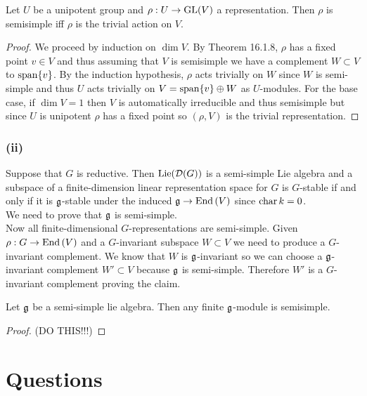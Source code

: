 \documentclass[12pt]{article}
\begin{document}
\begin{lemma}
Let $U$ be a unipotent group and $\rho : U \to \mathrm{GL}{(V)}$ a representation. Then $\rho$ is semisimple iff $\rho$ is the trivial action on $V$.
\end{lemma}

\begin{proof}
We proceed by induction on $\dim{V}$. By Theorem 16.1.8, $\rho$ has a fixed point $v \in V$ and thus assuming that $V$ is semisimple we have a complement $W \subset V$ to $\mathrm{span}\! \left\{v \right\}$. By the induction hypothesis, $\rho$ acts trivially on $W$ since $W$ is semi-simple and thus $U$ acts trivially on $V = \mathrm{span}\! \left\{v \right\} \oplus W$ as $U$-modules. For the base case, if $\dim{V} = 1$ then $V$ is automatically irreducible and thus semisimple but since $U$ is unipotent $\rho$ has a fixed point so $(\rho, V)$ is the trivial representation. 
\end{proof}

\subsubsection{(ii)}

Suppose that $G$ is reductive. Then $\mathrm{Lie}{(\mathcal{D}(G))}$ is a semi-simple Lie algebra and a subspace of a finite-dimension linear representation space for $G$ is $G$-stable if and only if it is $\mathfrak{g}$-stable under the induced $\mathfrak{g} \to \mathrm{End}\left( V \right)$ since $\operatorname{\mathrm{char}}{k} = 0$.
\bigskip\\
We need to prove that $\mathfrak{g}$ is semi-simple. 
\bigskip\\
Now all finite-dimensional $G$-representations are semi-simple. Given $\rho : G \to \mathrm{End}\left( V \right)$ and a $G$-invariant subspace $W \subset V$ we need to produce a $G$-invariant complement. We know that $W$ is $\mathfrak{g}$-invariant so we can choose a $\mathfrak{g}$-invariant complement $W' \subset V$ because $\mathfrak{g}$ is semi-simple. Therefore $W'$ is a $G$-invariant complement proving the claim. 


\begin{lemma}[Weyl]
Let $\mathfrak{g}$ be a semi-simple lie algebra. Then any finite $\mathfrak{g}$-module is semisimple.
\end{lemma}

\begin{proof}
(DO THIS!!!)
\end{proof}

\section{Questions}
\end{document}
